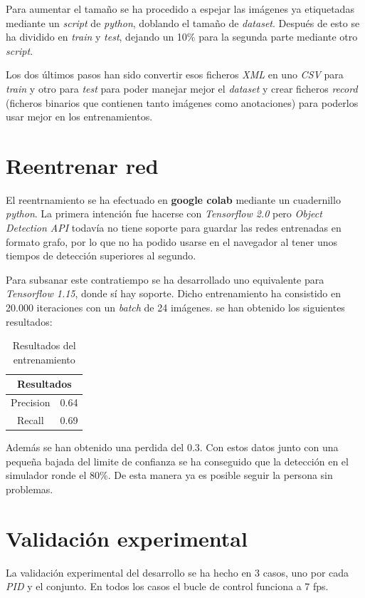Para aumentar el tamaño se ha procedido  a espejar las imágenes ya etiquetadas mediante un \textit{script} de \textit{python}, doblando el tamaño de \textit{dataset}. Después de esto se ha dividido en \textit{train} y \textit{test}, dejando un 10\% para la segunda parte mediante otro \textit{script}.

Los dos últimos pasos han sido convertir esos ficheros \textit{XML} en uno \textit{CSV} para \textit{train} y otro para \textit{test} para poder manejar mejor el \textit{dataset} y crear ficheros \textit{record} (ficheros binarios que contienen tanto imágenes como anotaciones) para poderlos usar mejor en los entrenamientos.
\section{Reentrenar red}
El reentrnamiento se ha efectuado en \textbf{google colab} mediante un cuadernillo \textit{python}. La primera intención fue hacerse con \textit{Tensorflow 2.0} pero \textit{Object Detection API} todavía no tiene soporte para guardar las redes entrenadas en formato grafo, por lo que no ha podido usarse en el navegador al tener unos tiempos de detección superiores al segundo.

Para subsanar este contratiempo se ha desarrollado uno equivalente para \textit{Tensorflow 1.15}, donde sí hay soporte. Dicho entrenamiento ha consistido en 20.000 iteraciones con un \textit{batch} de 24 imágenes.
se han obtenido los siguientes resultados: 
\begin{table}[H]
\centering
\begin{tabular}{|c|c|}

\multicolumn{2}{c}{\textbf{Resultados}} \\ \hline
Precision             & 0.64            \\ \hline
Recall                & 0.69            \\ \hline
\end{tabular}
\caption{Resultados del entrenamiento}
\label{tab:cambios_python_2_3}
\end{table}

Además se han obtenido una perdida del 0.3.
Con estos datos junto con una pequeña bajada del limite de confianza se ha conseguido que la detección en el simulador ronde el 80\%. De esta manera ya es posible seguir la persona sin problemas.
\section{Validación experimental}
La validación experimental del desarrollo se ha hecho en 3 casos, uno por cada \textit{PID} y el conjunto. En todos los casos el bucle de control funciona a 7 \acrshort{fps}.

